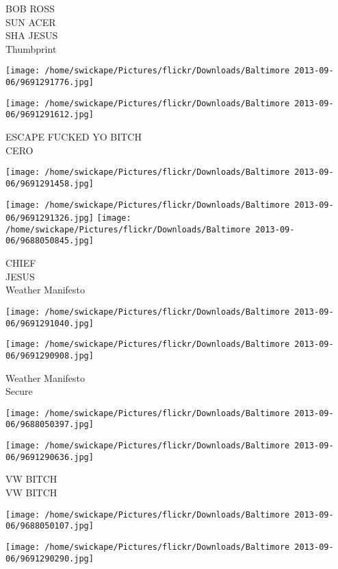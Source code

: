 \documentclass[10pt,letterpaper]{article}
\begin{document}
BOB ROSS\\
SUN ACER\\
SHA JESUS\\
Thumbprint
\pagebreak

\texttt{[image: /home/swickape/Pictures/flickr/Downloads/Baltimore 2013-09-06/9691291776.jpg]}

\vspace{0.25in}
\texttt{[image: /home/swickape/Pictures/flickr/Downloads/Baltimore 2013-09-06/9691291612.jpg]}

ESCAPE FUCKED YO BITCH\\
CERO
\pagebreak

\texttt{[image: /home/swickape/Pictures/flickr/Downloads/Baltimore 2013-09-06/9691291458.jpg]}

\vspace{0.25in}
\texttt{[image: /home/swickape/Pictures/flickr/Downloads/Baltimore 2013-09-06/9691291326.jpg]}
\texttt{[image: /home/swickape/Pictures/flickr/Downloads/Baltimore 2013-09-06/9688050845.jpg]}

CHIEF\\
JESUS\\
Weather Manifesto
\pagebreak

\texttt{[image: /home/swickape/Pictures/flickr/Downloads/Baltimore 2013-09-06/9691291040.jpg]}

\vspace{0.25in}
\texttt{[image: /home/swickape/Pictures/flickr/Downloads/Baltimore 2013-09-06/9691290908.jpg]}

Weather Manifesto\\
Secure
\pagebreak

\texttt{[image: /home/swickape/Pictures/flickr/Downloads/Baltimore 2013-09-06/9688050397.jpg]}

\vspace{0.25in}
\texttt{[image: /home/swickape/Pictures/flickr/Downloads/Baltimore 2013-09-06/9691290636.jpg]}

VW BITCH\\
VW BITCH
\pagebreak

\texttt{[image: /home/swickape/Pictures/flickr/Downloads/Baltimore 2013-09-06/9688050107.jpg]}

\vspace{0.25in}
\texttt{[image: /home/swickape/Pictures/flickr/Downloads/Baltimore 2013-09-06/9691290290.jpg]}
\end{document}
